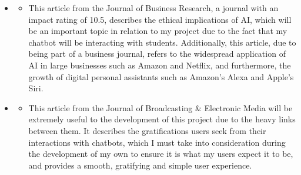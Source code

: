 \documentclass[12pt]{report}
\begin{document}
\begin{itemize}
        \item {}
        \begin{itemize}
            \item This article from the Journal of Business Research, a journal with an impact rating of 10.5,
            describes the ethical implications of AI, which will be an important topic in relation to my project
            due to the fact that my chatbot will be interacting with students. Additionally, this article,
            due to being part of a business journal, refers to the widespread application of AI in large businesses
            such as Amazon and Netflix, and furthermore, the growth of digital personal assistants such as Amazon's
            Alexa and Apple's Siri. 
        \end{itemize}

        \item {}
        \begin{itemize}
            \item This article from the Journal of Broadcasting \& Electronic Media will be extremely useful to 
            the development of this project due to the heavy links between them. It describes the gratifications
            users seek from their interactions with chatbots, which I must take into consideration during the 
            development of my own to ensure it is what my users expect it to be, and provides a smooth, gratifying
            and simple user experience.
        \end{itemize}
    \end{itemize}

    \printbibliography
\end{document}
